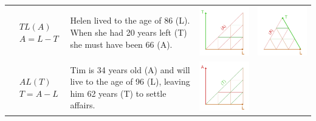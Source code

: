 \documentclass[12pt,oneside,a4paper]{article} %
\begin{document}
\begin{longtable}{m{}L{0.37\textwidth}m{0.17\textwidth}m{0.2\textwidth}}
  $$\begin{aligned}
    &TL(A) \\
    &A = L - T
  \end{aligned}$$ &
  Helen lived to the age of 86 (L). When she had 20 years left (T) she must have been 66 (A). &
  \includegraphics[scale=.5]{Figures/DiagramTable/TL_rt.pdf} &
  \includegraphics[scale=.5]{Figures/DiagramTable/TL_iso.pdf}  \\
  $$\begin{aligned}
    &AL(T) \\
    &T = A - L
  \end{aligned}$$ &
  Tim is 34 years old (A) and will live to the age of 96 (L), leaving him 62 years (T) to settle affairs. &
  \includegraphics[scale=.5]{Figures/DiagramTable/AL_rt.pdf} &

\end{longtable}
\end{document}
